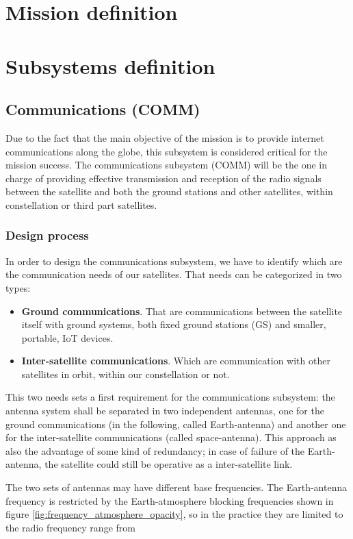 \section{Mission definition}

\section{Subsystems definition}

\subsection{Communications (COMM)}
Due to the fact that the main objective of the mission is to provide internet
communications along the globe, this subsystem is considered critical for the
mission success. The communications subsystem (COMM) will be the one in charge
of providing effective transmission and reception of the radio signals between the
satellite and both the ground stations and other satellites, within \MissionName
constellation or third part satellites.

\subsubsection{Design process}
In order to design the communications subsystem, we have to identify which are
the communication needs of our satellites. That needs can be categorized in two types:

\begin{itemize}
	\item \textbf{Ground communications}. That are communications between the
	satellite itself with ground systems, both fixed ground stations (GS) and
	smaller, portable, IoT devices.
	\item \textbf{Inter-satellite communications}. Which are communication
	with other satellites in orbit, within our constellation or not.
\end{itemize}

This two needs sets a first requirement for the communications subsystem:
the antenna system shall be separated in two independent antennas, one for the
ground communications (in the following, called Earth-antenna) and another one for
the inter-satellite communications (called space-antenna). This approach as also the
advantage of some kind of redundancy; in case of failure of the Earth-antenna, the
satellite could still be operative as a inter-satellite link.

The two sets of antennas may have different base frequencies. The Earth-antenna
frequency is restricted by the Earth-atmosphere blocking frequencies shown in
figure \ref{fig:frequency_atmosphere_opacity}, so in the practice they are limited
to the radio frequency range from 

